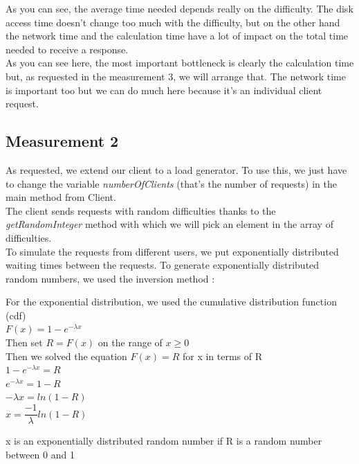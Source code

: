 \documentclass[11pt,a4paper]{article}
\begin{document}
As you can see, the average time needed depends really on the difficulty. The disk access time doesn't change too much with the difficulty, but on the other hand the network time and the calculation time have a lot of impact on the total time needed to receive a response.\\
As you can see here, the most important bottleneck is clearly the calculation time but, as requested in the measurement 3, we will arrange that. The network time is important too but we can do much here because it's an individual client request.

\subsection{Measurement 2}

As requested, we extend our client to a load generator. To use this, we just have to change the variable \textit{numberOfClients} (that's the number of requests) in the main method from Client.\\
The client sends requests with random difficulties thanks to the \textit{getRandomInteger} method with which we will pick an element in the array of difficulties.\\
To simulate the requests from different users, we put exponentially distributed waiting times between the requests. To generate exponentially distributed random numbers, we used the inversion method :
\begin{center}
For the exponential distribution, we used the cumulative distribution function (cdf)\\
\vspace{5px}
$ F(x) = 1-e^{-\lambda x} $\\
\vspace{10px}
Then set $ R = F(x) $ on the range of $ x \ge 0 $\\
\vspace{5px}
Then we solved the equation $ F(x) = R $ for x in terms of R \\
\vspace{10px}
$ 1-e^{-\lambda x} = R $\\
$ e^{-\lambda x} = 1 - R $\\
$ -\lambda x = ln(1 - R) $\\
$ x = \dfrac{-1}{\lambda}ln(1 - R) $
\end{center}

x is an exponentially distributed random number if R is a random number between 0 and 1\\
\end{document}
